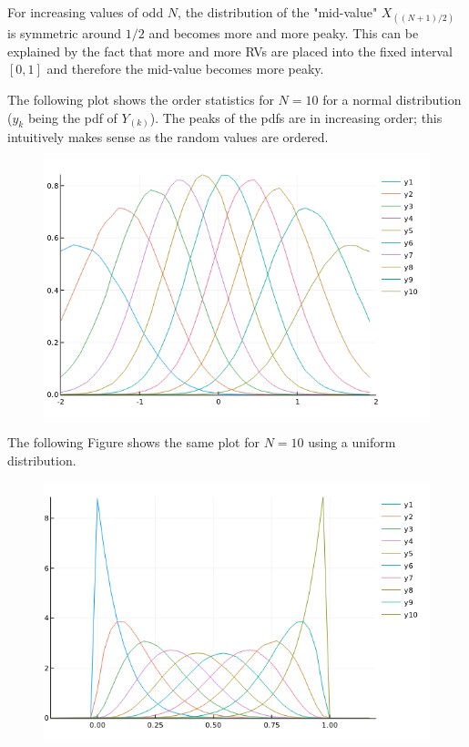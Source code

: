 For increasing values of odd $N$, the distribution of the "mid-value" $X_{((N+1)/2)}$ is symmetric around $1/2$ and becomes more and more peaky. This can be explained by the fact that more and more RVs are placed into the fixed interval $[0,1]$ and therefore the mid-value becomes more peaky.

The following plot shows the order statistics for $N=10$ for a normal distribution ($y_k$ being the pdf of $Y_{(k)}$). The peaks of the pdfs are in increasing order; this intuitively makes sense as the random values are ordered.


\begin{figure}[H]
	\centering
	\includegraphics[scale=0.7]{images/order_stat_2_2.png}
\end{figure}


The following Figure shows the same plot for $N=10$ using a uniform distribution.

\begin{figure}[H]
	\centering
	\includegraphics[scale=0.7]{images/order_stat_2_3.png}
\end{figure}

